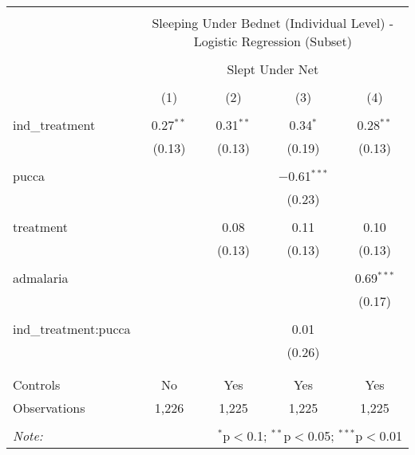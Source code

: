 
\begin{table}[!htbp] \centering 
  \caption{} 
  \label{tbl:Sleeping Under Bednet (Individual Level) - Logistic Regression (Subset)} 
\begin{tabular}{@{\extracolsep{5pt}}lcccc} 
\\[-1.8ex]\hline 
\hline \\[-1.8ex] 
 & \multicolumn{4}{c}{Sleeping Under Bednet (Individual Level) - Logistic Regression (Subset)} \\ 
\cline{2-5} 
\\[-1.8ex] & \multicolumn{4}{c}{Slept Under Net} \\ 
\\[-1.8ex] & (1) & (2) & (3) & (4)\\ 
\hline \\[-1.8ex] 
 ind\_treatment & 0.27$^{**}$ & 0.31$^{**}$ & 0.34$^{*}$ & 0.28$^{**}$ \\ 
  & (0.13) & (0.13) & (0.19) & (0.13) \\ 
  & & & & \\ 
 pucca &  &  & $-$0.61$^{***}$ &  \\ 
  &  &  & (0.23) &  \\ 
  & & & & \\ 
 treatment &  & 0.08 & 0.11 & 0.10 \\ 
  &  & (0.13) & (0.13) & (0.13) \\ 
  & & & & \\ 
 admalaria &  &  &  & 0.69$^{***}$ \\ 
  &  &  &  & (0.17) \\ 
  & & & & \\ 
 ind\_treatment:pucca &  &  & 0.01 &  \\ 
  &  &  & (0.26) &  \\ 
  & & & & \\ 
\hline \\[-1.8ex] 
Controls & No & Yes & Yes & Yes \\ 
Observations & 1,226 & 1,225 & 1,225 & 1,225 \\ 
\hline 
\hline \\[-1.8ex] 
\textit{Note:}  & \multicolumn{4}{r}{$^{*}$p$<$0.1; $^{**}$p$<$0.05; $^{***}$p$<$0.01} \\ 
\end{tabular} 
\end{table} 
